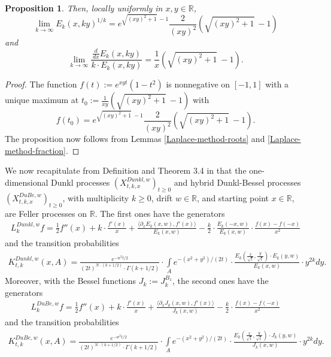 \documentclass[reqno]{amsart}
\theoremstyle{plain}
\newtheorem{proposition}[theorem]{Proposition}
\theoremstyle{definition}
\numberwithin{equation}{section}
\newcommand{\R}{\mathbb{R}}
\begin{document}
\begin{proposition}\label{limit-Dunkl-kernel-1dim}
  Then, locally uniformly in $x,y\in \mathbb R$,
  \begin{equation}\label{limit-dunklkernel1} 
\lim_{k\to\infty} E_k(x,ky)^{1/k}= e^{\sqrt{ (xy)^2+1}\> -1}\frac{2}{(xy)^2}(\sqrt{( xy)^2+1}\> -1)
  \end{equation}
  and
\begin{equation}\label{limit-dunklkernel2} 
\lim_{k\to\infty} \frac{\frac{d}{dx}E_k(x,ky)}{k\cdot E_k(x,ky)}=\frac{1}{x}(\sqrt{( xy)^2+1}\> -1) .
  \end{equation}
\end{proposition}

\begin{proof} The function $f(t):=  e^{xy t}(1-t^2)$  is nonnegative on $[-1,1]$ with a unique maximum at
  $t_0:=\frac{1}{xy}(\sqrt{( xy)^2+1}\> -1)$ with 
  $$f(t_0)=e^{\sqrt{ (xy)^2+1}\> -1}\frac{2}{(xy)^2}(\sqrt{( xy)^2+1}\> -1).$$
  The proposition now follows from Lemmas \ref{Laplace-method-roots} and \ref{Laplace-method-fraction}.
  \end{proof}



We now recapitulate from 
Definition and Theorem 3.4 in \cite{V2} that
the one-dimensional Dunkl processes $(X^{Dunkl,w}_{t,k,x})_{t \geq 0}$ and hybrid Dunkl-Bessel processes $(X^{DuBe,w}_{t,k,x})_{t \geq 0}$,
with multiplicity $k \geq 0$, drift $w \in \R$, and starting point $x\in\R$, are Feller processes on $\R$.
The first ones have the generators
\begin{align*}
L_k^{Dunkl,w}f=\frac{1}{2} f''(x) + k \cdot \frac{f'(x)}{x} + \frac{\langle \partial_x E_k(x,w),f'(x) \rangle}{E_k(x,w)} 
- \frac{k}{2} \cdot \frac{E_k(-x,w)}{E_k(x,w)} \cdot \frac{f(x)-f(-x)}{x^2}
\end{align*}
and the transition probabilities
\begin{align}
\label{kernels-Dunkl}
K^{Dunkl,w}_{t,k}(x,A)=\frac{e^{-w^2 t/2}}{(2t)^{N \cdot (k + 1/2)} \cdot \Gamma(k + 1/2)}
\cdot \int\limits_A e^{-(x^2+y^2)/(2t)} \cdot \frac{E_k(\frac{x}{\sqrt t},\frac{y}{\sqrt{t}}) \cdot E_k(y,w)}{E_k(x,w)} \cdot y^{2k} dy.
\end{align}
Moreover, with the Bessel functions  $J_k:=J_k^{B_1}$, the second ones have the generators 
\begin{align*}
L_k^{DuBe,w}f=\frac{1}{2} f''(x) + k \cdot \frac{f'(x)}{x} + \frac{\langle \partial_x J_k(x,w),f'(x) \rangle}{J_k(x,w)} 
- \frac{k}{2} \cdot \frac{f(x)-f(-x)}{x^2}
\end{align*}
and the transition probabilities
\begin{align}
\label{kernels-Dunkl2}
K^{DuBe,w}_{t,k}(x,A)=\frac{e^{-w^2 t/2}}{(2t)^{N \cdot (k + 1/2)} \cdot \Gamma(k + 1/2)}
\cdot \int\limits_A e^{-(x^2+y^2)/(2t)} \cdot \frac{E_k(\frac{x}{\sqrt t},\frac{y}{\sqrt{t}}) \cdot J_k(y,w)}{J_k(x,w)} \cdot y^{2k} dy.
\end{align}
\end{document}
